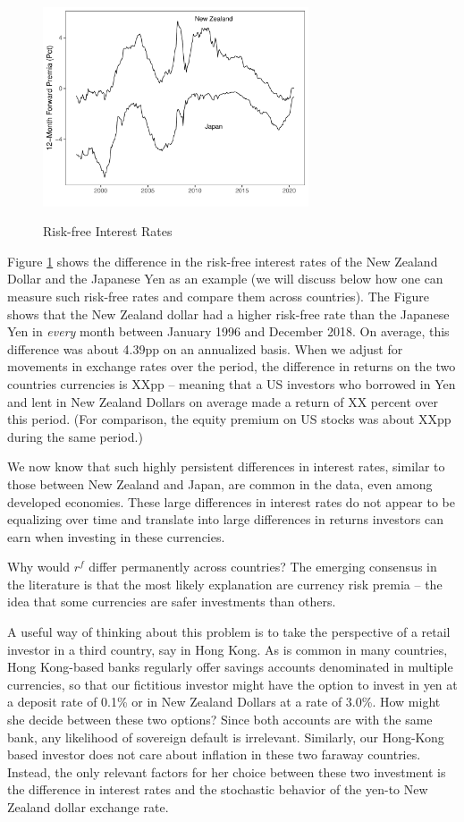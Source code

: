 \documentclass{ar-1col}
\begin{document}
\begin{figure}
    \centering
    \caption{Risk-free Interest Rates}
    \includegraphics[width=0.7\textwidth]{Exhibits/Figure_FP12M_JPYNZD.pdf}
    \label{fig:fp}
\end{figure}
Figure \ref{fig:fp} shows the difference in the risk-free interest rates of the
New Zealand Dollar and the Japanese Yen as an example (we will discuss
below how one can measure such risk-free rates and compare them across
countries). The Figure shows that the New Zealand dollar had a higher
risk-free rate than the Japanese Yen in \textit{every} month between
January 1996 and December 2018. On average, this difference was about 
4.39pp on an annualized basis. When we adjust for movements in exchange rates over
the period, the difference in returns on the two countries currencies
is XXpp -- meaning that a US investors who borrowed in Yen and lent in
New Zealand Dollars on average made a return of XX percent over this
period. (For comparison, the equity premium on US stocks was about
XXpp during the same period.)

We now know that such highly persistent differences in interest rates,
similar to those between New Zealand and Japan, are common in the
data, even among developed economies. These large differences in
interest rates do not appear to be equalizing over
time and translate into large differences in returns investors can
earn when investing in these currencies.

Why would $r^f$ differ permanently across countries? The emerging
consensus in the literature is that the most likely explanation are
currency risk premia -- the idea that some currencies are safer
investments than others. 

A useful way of thinking about this problem
is to take the perspective of a retail investor in a third country, say in Hong Kong.
As is common in many countries, Hong Kong-based banks regularly offer savings accounts denominated in multiple currencies, so that our fictitious investor might have the option to invest in yen at a deposit rate of 0.1\% or in New Zealand Dollars at a rate of 3.0\%. How might she decide between these two options? Since both accounts are with the same bank, any likelihood of sovereign default is irrelevant. Similarly, our Hong-Kong based investor does not care about inflation in these two faraway countries. Instead, the only relevant factors for her choice between these two investment is the difference in interest rates and the stochastic behavior of the yen-to New Zealand dollar exchange rate. 
\end{document}
